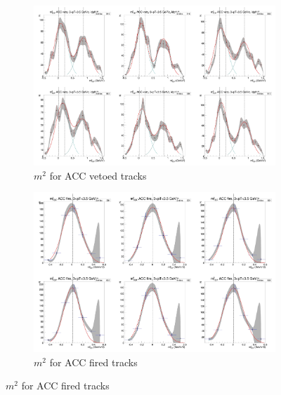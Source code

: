 \begin{figure}[H]
  \ContinuedFloat
    \begin{subfigure}{1\textwidth}
    \includegraphics[width=1\textwidth]{hiptfits/pos/PSm2_cent0_ich1_accfire0_ptbin12.jpg}
    \caption{$m^2$ for ACC vetoed tracks}
    \end{subfigure}
    \begin{subfigure}{1\textwidth}
    \includegraphics[width=1\textwidth]{hiptfits/pos/PSm2_cent0_ich1_accfire1_ptbin12.jpg}
    \caption{$m^2$ for ACC fired tracks}
    \end{subfigure}  
\end{figure}
